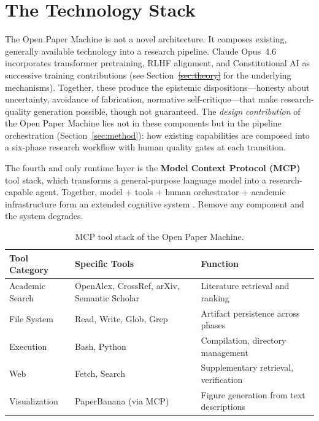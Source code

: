 \documentclass{article}
\providecommand{\DIFaddtex}[1]{{\protect\color{blue}\uwave{#1}}} %
\providecommand{\DIFdeltex}[1]{{\protect\color{red}\sout{#1}}}                      %
\providecommand{\DIFaddbegin}{} %
\providecommand{\DIFaddend}{} %
\providecommand{\DIFdelbegin}{} %
\providecommand{\DIFdelend}{} %
\providecommand{\DIFadd}[1]{\texorpdfstring{\DIFaddtex{#1}}{#1}} %
\providecommand{\DIFdel}[1]{\texorpdfstring{\DIFdeltex{#1}}{}} %
\newcommand{\DIFscaledelfig}{0.5}
\newlength{\DIFdelgraphicswidth} %
\newlength{\DIFdelgraphicsheight} %
\newcommand{\DIFaddincludegraphics}[2][]{{\color{blue}\fbox{\DIFOincludegraphics[#1]{#2}}}} %
\newcommand{\DIFdelincludegraphics}[2][]{%
\sbox{\DIFdelgraphicsbox}{\DIFOincludegraphics[#1]{#2}}%
\settoboxwidth{\DIFdelgraphicswidth}{\DIFdelgraphicsbox} %
\settoboxtotalheight{\DIFdelgraphicsheight}{\DIFdelgraphicsbox} %
\scalebox{\DIFscaledelfig}{%
\parbox[b]{\DIFdelgraphicswidth}{\usebox{\DIFdelgraphicsbox}\\[-\baselineskip] \rule{\DIFdelgraphicswidth}{0em}}\llap{\resizebox{\DIFdelgraphicswidth}{\DIFdelgraphicsheight}{%
\setlength{\unitlength}{\DIFdelgraphicswidth}%
\begin{picture}(1,1)%
\thicklines\linethickness{2pt} %
{\color[rgb]{1,0,0}\put(0,0){\framebox(1,1){}}}%
{\color[rgb]{1,0,0}\put(0,0){\line( 1,1){1}}}%
{\color[rgb]{1,0,0}\put(0,1){\line(1,-1){1}}}%
\end{picture}%
}\hspace*{3pt}}} %
} %
\DeclareRobustCommand{\DIFaddbegin}{\DIFOaddbegin \let\includegraphics\DIFaddincludegraphics} %
\DeclareRobustCommand{\DIFaddend}{\DIFOaddend \let\includegraphics\DIFOincludegraphics} %
\DeclareRobustCommand{\DIFdelbegin}{\DIFOdelbegin \let\includegraphics\DIFdelincludegraphics} %
\DeclareRobustCommand{\DIFdelend}{\DIFOaddend \let\includegraphics\DIFOincludegraphics} %
\begin{document}
\section{The Technology Stack}
\label{sec:architecture}

The Open Paper Machine is not a novel architecture. It composes existing, generally available technology into a research pipeline. Claude Opus~4.6 incorporates transformer pretraining, RLHF alignment, and Constitutional AI as successive training contributions (see Section~\DIFdelbegin \DIFdel{\ref{sec:theory} }\DIFdelend \DIFaddbegin \DIFadd{\ref{sec:tech} }\DIFaddend for the underlying mechanisms). Together, these produce the epistemic dispositions---honesty about uncertainty, avoidance of fabrication, normative self-critique---that make research-quality generation possible, though not guaranteed. The \textit{design contribution} of the Open Paper Machine lies not in these components but in the pipeline orchestration (Section~\ref{sec:method}): how existing capabilities are composed into a six-phase research workflow with human quality gates at each transition.

The fourth and only runtime layer is the \textbf{Model Context Protocol (MCP)} tool stack, which transforms a general-purpose language model into a research-capable agent. Together, model + tools + human orchestrator + academic infrastructure form an extended cognitive system \citep{hutchins1995cognition}. Remove any component and the system degrades.


\begin{table}[ht]
\centering
\caption{MCP tool stack of the Open Paper Machine.}
\label{tab:tools}
\begin{tabularx}{\textwidth}{@{}lXX@{}}
\toprule
\textbf{Tool Category} & \textbf{Specific Tools} & \textbf{Function} \\
\midrule
Academic Search & OpenAlex, CrossRef, arXiv, Semantic Scholar & Literature retrieval and ranking \\
File System & Read, Write, Glob, Grep & Artifact persistence across phases \\
Execution & Bash, Python & Compilation, directory management \\
Web & Fetch, Search & Supplementary retrieval, verification \\
Visualization & PaperBanana (via MCP) & Figure generation from text descriptions \\
\bottomrule
\end{tabularx}
\end{table}
\end{document}
